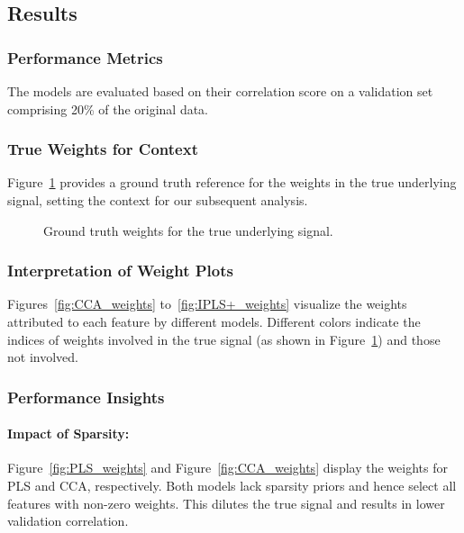 \subsection{Results}
\subsubsection{Performance Metrics}
The models are evaluated based on their correlation score on a validation set comprising 20\% of the original data.

\subsubsection{True Weights for Context}

Figure~\ref{fig:True_weights} provides a ground truth reference for the weights in the true underlying signal, setting the context for our subsequent analysis.

\begin{figure}[h]
    \centering
    
    \caption{Ground truth weights for the true underlying signal.}
    \label{fig:True_weights}
\end{figure}

\subsubsection{Interpretation of Weight Plots}

Figures~\ref{fig:CCA_weights} to~\ref{fig:IPLS+_weights} visualize the weights attributed to each feature by different models.
Different colors indicate the indices of weights involved in the true signal (as shown in Figure~\ref{fig:True_weights}) and those not involved.

\subsubsection{Performance Insights}

\paragraph{Impact of Sparsity:}
Figure~\ref{fig:PLS_weights} and Figure~\ref{fig:CCA_weights} display the weights for PLS and CCA, respectively.
Both models lack sparsity priors and hence select all features with non-zero weights.
This dilutes the true signal and results in lower validation correlation.

